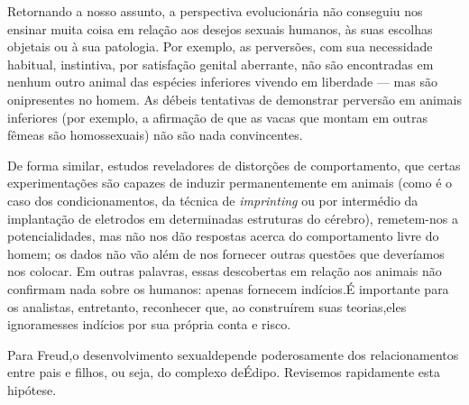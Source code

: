  Retornando a nosso assunto, a perspectiva evolucionária não conseguiu
nos ensinar muita coisa em relação aos desejos sexuais humanos, às suas
escolhas objetais ou à sua patologia. Por exemplo, as perversões, com
sua necessidade habitual, instintiva, por satisfação genital aberrante,
não são encontradas em nenhum outro animal das espécies inferiores
vivendo em liberdade --- mas são onipresentes no homem. As débeis
tentativas de demonstrar perversão em animais inferiores (por exemplo,
a afirmação de que as vacas que montam em outras fêmeas são
homossexuais) não são nada convincentes.

 De forma similar, estudos reveladores de distorções de comportamento,
que certas experimentações são capazes de induzir permanentemente em
animais (como é o caso dos condicionamentos,\idxcond{} da técnica de
\textit{imprinting}\idxestam{} ou por intermédio da
implantação de eletrodos em determinadas estruturas do cérebro),
remetem-nos a potencialidades, mas não nos dão respostas acerca do
comportamento livre do homem; os dados não vão além de nos fornecer
outras questões que deveríamos nos colocar. Em outras palavras, essas
descobertas em relação aos animais não confirmam nada sobre os humanos:
apenas fornecem indícios.\idxanimvers[|)] É importante para os analistas, entretanto,
reconhecer que, ao construírem suas teorias,\idxcereb[|)] eles ignoram\idxsexui[|)] esses
indícios por sua própria conta e risco.

 Para Freud,\idxfreud[|(] o desenvolvimento sexual\idxinfansexua[|)] depende poderosamente dos
relacionamentos entre pais e filhos, ou seja, do complexo de\idxconfe[|(] Édipo.\idxmascucon{}
Revisemos rapidamente esta hipótese.

